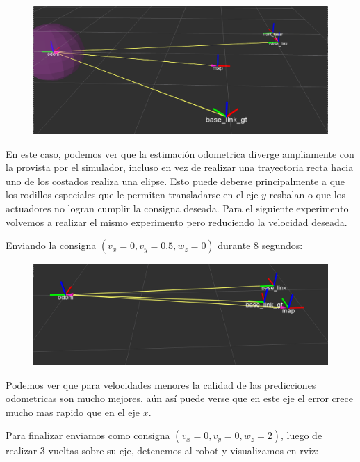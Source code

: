 \begin{figure}[!htb]
\includegraphics[width=\linewidth]{pruebasOdom/8segIzquierda2.png}
\end{figure}

En este caso, podemos ver que la estimación odometrica diverge ampliamente con la provista por el simulador, incluso en vez de realizar una trayectoria recta hacia uno de los costados realiza una elipse. Esto puede deberse principalmente a que los rodillos especiales que le permiten transladarse en el eje $y$ resbalan o que los actuadores no logran cumplir la consigna deseada. Para el siguiente experimento volvemos a realizar el mismo experimento pero reduciendo la velocidad deseada.


Enviando la consigna $(v_x = 0, v_y=0.5,w_z=0)$ durante 8 segundos: 

\begin{figure}[!htb]
\includegraphics[width=\linewidth]{pruebasOdom/8segIzquierda05.png}
\end{figure}

Podemos ver que para velocidades menores la calidad de las predicciones odometricas son mucho mejores, aún así puede verse que en este eje el error crece mucho mas rapido que en el eje $x$.

\pagebreak

Para finalizar enviamos como consigna $(v_x = 0, v_y=0,w_z=2)$, luego de realizar 3 vueltas sobre su eje, detenemos al robot y visualizamos en rviz:

